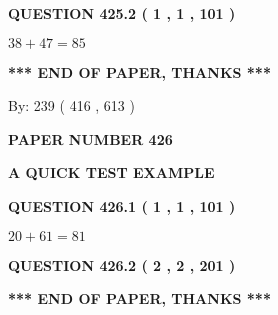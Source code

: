 \documentclass[12pt]{article}
\begin{document}
  
  
\vspace{0.2in}
  
{\textbf{\Large{QUESTION
425.2 
 ( 1 , 1 , 101 )
}}}
  
  
 
 

$ %
38 +  %
47=   %
85$
 
 
   
   
 \vspace{0.2in}
 
   
   
   
   
\vspace{1.0in} 
{\textbf{\large{ *** END OF PAPER, THANKS *** }}} 
   
   
\hspace{1.0in} By: 
 239 ( 416 ,  613 )
   
   
   
   
\newpage 
\setcounter{page}{ 
   426001 } 
   
   
   
   
 {\textbf{ \Large{ PAPER NUMBER  426  }}}
   
   
\vspace{0.2in}
   
   
   
   
   
   
 \vspace{0.2in}
{\LARGE {\textbf{ A QUICK TEST EXAMPLE}}}
   
   
  
\vspace{0.2in}
  
{\textbf{\Large{QUESTION
426.1 
 ( 1 , 1 , 101 )
}}}
  
  
 
 

$ %
20 +  %
61=   %
81$
 
 
  
\vspace{0.2in}
  
{\textbf{\Large{QUESTION
426.2 
 ( 2 , 2 , 201 )
}}}
  
  
   
   
 \vspace{0.2in}
 
   
   
   
   
\vspace{1.0in} 
{\textbf{\large{ *** END OF PAPER, THANKS *** }}} 
   
\end{document}
